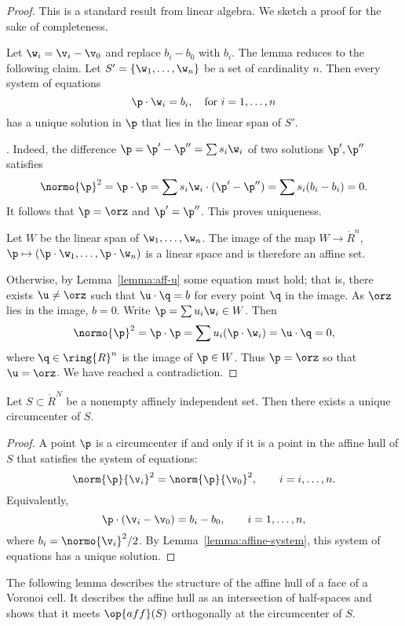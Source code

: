 \begin{proof} This is a standard result from linear algebra.
We sketch a proof for the sake of completeness.  

Let $\w_i = \v_i-\v_0$ and replace $b_i-b_0$ with $b_i$.  
The lemma reduces to the following claim.
Let $S' = \{\w_1,\ldots,\w_n\}$ be a  set
of cardinality $n$.  Then every system of equations
\[  
\p \cdot \w_i = b_i,\quad \text{for }i=1,\ldots,n
\] 
has a unique solution in $\p$ that lies in the linear span of $S'$.

. Indeed, the difference 
$\p = \p'-\p'' = \sum s_i \w_i$ of two solutions
$\p',\p''$ satisfies
\[  
\normo{\p}^2=\p\cdot\p = \sum s_i \w_i \cdot (\p' - \p'') =
\sum s_i (b_i-b_i)= 0.
\] 
It follows that $\p=\orz$ and $\p'=\p''$.  This proves uniqueness.

Let $W$ be the linear span of $\w_1,\ldots,\w_n$.  The image of the
map $W\to\ring{R}^n$, $\p\mapsto (\p\cdot\w_1,\ldots,\p\cdot\w_n)$ is
a linear space and is therefore an affine set.

Otherwise, by Lemma~\ref{lemma:aff-u} some equation must hold; that
is, there exists $\u\ne \orz$ such that $\u\cdot \q =b$ for every
point $\q$ in the image.  As $\orz$ lies in the image, $b=0$.  Write
$\p = \sum u_i \w_i\in W$.  Then
\[  
\normo{\p}^2 = \p\cdot\p = \sum u_i (\p \cdot \w_i) = \u\cdot \q = 0,
\]  
where $\q\in\ring{R}^n$ is the image of $\p\in W$.
Thus $\p=\orz$ so that $\u=\orz$.  We have reached a contradiction.
\end{proof}

\begin{lemma} 
  Let $S\subset \ring{R}^N$ be a nonempty affinely independent set.
  Then there exists a unique circumcenter of $S$.
\end{lemma}

\begin{proof} 
  A point $\p$ is a circumcenter if and only if it is a point in the
  affine hull of $S$ that satisfies the system of equations:
\[  
\norm{\p}{\v_i}^2 = \norm{\p}{\v_0}^2,\qquad i = i,\ldots,n.
\] 
Equivalently,
\[  
\p\cdot (\v_i-\v_0) = b_i-b_0,\qquad i=1,\ldots,n,
\] 
where $b_i = \normo{\v_i}^2/2$.  By
Lemma~\ref{lemma:affine-system}, this system of equations has a unique
solution.
\end{proof}

The following lemma describes the structure of the affine hull of a
face of a Voronoi cell.  It describes the affine hull as an intersection of half-spaces
and shows that it meets $\op{aff}(S)$ orthogonally at the circumcenter of $S$.

